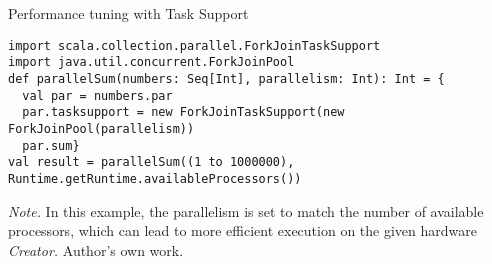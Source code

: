 \begin{table}[h!]
\caption{Performance tuning with Task Support}
\begin{lstlisting}
import scala.collection.parallel.ForkJoinTaskSupport
import java.util.concurrent.ForkJoinPool
def parallelSum(numbers: Seq[Int], parallelism: Int): Int = {
  val par = numbers.par
  par.tasksupport = new ForkJoinTaskSupport(new ForkJoinPool(parallelism))
  par.sum}
val result = parallelSum((1 to 1000000), Runtime.getRuntime.availableProcessors())
\end{lstlisting}
\small
\textit{Note.} In this example, the parallelism is set to match the number of available processors, which can lead to more efficient execution on the given hardware 
\textit{Creator.} Author's own work.
\end{table}